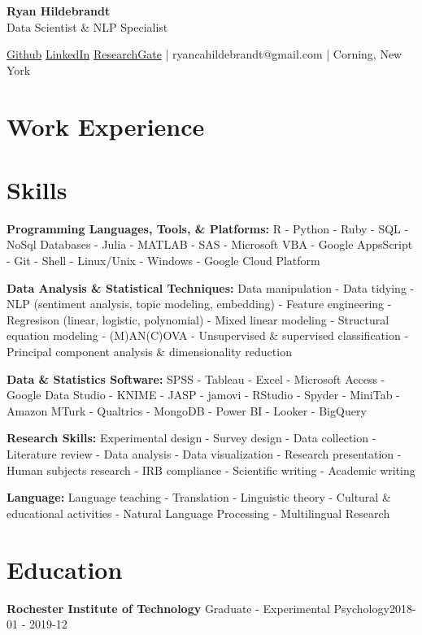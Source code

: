 \documentclass[a4paper,9pt]{extarticle}
\begin{document}
\begin{center}\textbf{\Large Ryan Hildebrandt}\\[2pt]
Data Scientist \& NLP Specialist

\href{https://github.com/ryancahildebrandt}{Github}
\href{https://linkedin.com/in/rcah}{LinkedIn}
\href{https://researchgate.net/profile/Ryan-Hildebrandt}{ResearchGate}
 | ryancahildebrandt@gmail.com | Corning, New York
\end{center}

\section*{Work Experience}

\section*{Skills}
\noindent\textbf{Programming Languages, Tools, \& Platforms:} R - Python - Ruby - SQL - NoSql Databases - Julia - MATLAB - SAS - Microsoft VBA - Google AppsScript - Git - Shell - Linux/Unix - Windows - Google Cloud Platform

\noindent\textbf{Data Analysis \& Statistical Techniques:} Data manipulation - Data tidying - NLP (sentiment analysis, topic modeling, embedding) - Feature engineering - Regresison (linear, logistic, polynomial) - Mixed linear modeling - Structural equation modeling - (M)AN(C)OVA - Unsupervised \& supervised classification - Principal component analysis \& dimensionality reduction

\noindent\textbf{Data \& Statistics Software:} SPSS - Tableau - Excel - Microsoft Access - Google Data Studio - KNIME - JASP - jamovi - RStudio - Spyder - MiniTab - Amazon MTurk - Qualtrics - MongoDB - Power BI - Looker - BigQuery

\noindent\textbf{Research Skills:} Experimental design - Survey design - Data collection - Literature review - Data analysis - Data visualization - Research presentation - Human subjects research - IRB compliance - Scientific writing - Academic writing

\noindent\textbf{Language:} Language teaching - Translation - Linguistic theory - Cultural \& educational activities - Natural Language Processing - Multilingual Research

\section*{Education}
\noindent\textbf{Rochester Institute of Technology}
Graduate - Experimental Psychology\hfill2018-01 - 2019-12
\end{document}
